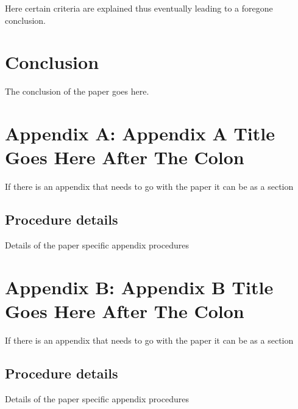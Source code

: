 Here certain criteria are explained thus eventually
leading to a foregone conclusion.

\section{Conclusion}\label{conclusion}

The conclusion of the paper goes here.
\autocite{buiEveryGeneratingPolytope2023}

\printbibliography[heading=subbibnumbered]

\section{Appendix A: Appendix A Title Goes Here After The Colon}
If there is an appendix that needs to go with the paper it can be as a section \autocite{kleeHellyTheoremIts1963}

\subsection{Procedure details}
Details of the paper specific appendix procedures


\section{Appendix B: Appendix B Title Goes Here After The Colon}
If there is an appendix that needs to go with the paper it can be as a section \autocite{chenGraphHomotopyGraham2001}

\subsection{Procedure details}
Details of the paper specific appendix procedures